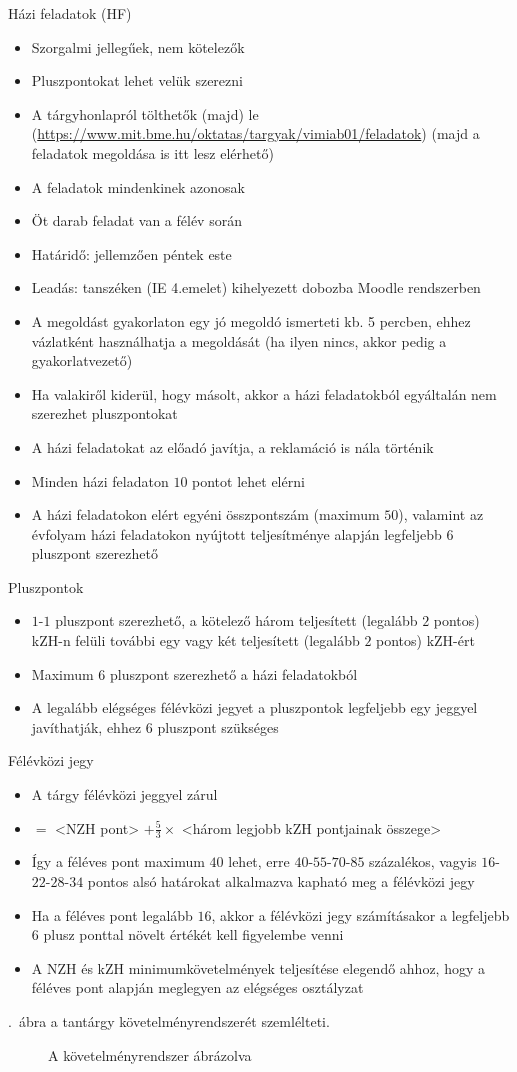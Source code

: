 \documentclass[a4paper,12pt]{article}
\newcommand{\jelenlet}{\color{gray}}
\newcommand{\tavollet}{\color{red}}
\begin{document}
	Házi feladatok (HF)
	\begin{itemize}
		\item Szorgalmi jellegűek, nem kötelezők
		\item Pluszpontokat lehet velük szerezni
		\item A tárgyhonlapról tölthetők (majd) le (\url{https://www.mit.bme.hu/oktatas/targyak/vimiab01/feladatok}) (majd a feladatok megoldása is itt lesz elérhető)
		\item A feladatok mindenkinek azonosak
		\item Öt darab feladat van a félév során
		\item Határidő: jellemzően péntek este
		\item Leadás: {\jelenlet tanszéken (IE 4.emelet) kihelyezett dobozba} {\tavollet Moodle rendszerben}
		\item A megoldást gyakorlaton egy jó megoldó ismerteti kb. 5 percben, ehhez vázlatként használhatja a megoldását (ha ilyen nincs, akkor pedig a gyakorlatvezető)
		\item Ha valakiről kiderül, hogy másolt, akkor a házi feladatokból egyáltalán nem szerezhet pluszpontokat
		\item A házi feladatokat az előadó javítja, a reklamáció is nála történik
		\item Minden házi feladaton $10$ pontot lehet elérni
		\item A házi feladatokon elért egyéni összpontszám (maximum $50$), valamint az évfolyam házi feladatokon nyújtott teljesítménye alapján legfeljebb $6$ pluszpont szerezhető
	\end{itemize}
	Pluszpontok
	\begin{itemize}
		\item $1$-$1$ pluszpont szerezhető, a kötelező három teljesített (legalább $2$ pontos) kZH-n felüli további egy vagy két teljesített (legalább $2$ pontos) kZH-ért
		\item Maximum $6$ pluszpont szerezhető a házi feladatokból
		\item A legalább elégséges félévközi jegyet a pluszpontok legfeljebb egy jeggyel javíthatják, ehhez $6$ pluszpont szükséges
	\end{itemize}
	Félévközi jegy
	\begin{itemize}
		\item A tárgy félévközi jeggyel zárul
		\item <Féléves pont> $=$ <NZH pont> $+\frac{5}{3}\times$ <három legjobb kZH pontjainak összege>
		\item Így a féléves pont maximum $40$ lehet, erre $40$-$55$-$70$-$85$ százalékos, vagyis $16$-$22$-$28$-$34$ pontos alsó határokat alkalmazva kapható meg a félévközi jegy
		\item Ha a féléves pont legalább $16$, akkor a félévközi jegy számításakor a legfeljebb $6$ plusz ponttal növelt értékét kell figyelembe venni
		\item A NZH és kZH minimumkövetelmények teljesítése elegendő ahhoz, hogy a féléves pont alapján meglegyen az elégséges osztályzat
	\end{itemize}
	\Az{\ref{fig:pontrendszer}}.~ábra a tantárgy követelményrendszerét szemlélteti.
	\begin{landscape}
		\begin{figure}[h]
			
			\caption{A követelményrendszer ábrázolva}
			\label{fig:pontrendszer}
		\end{figure}
	\end{landscape}
\end{document}
